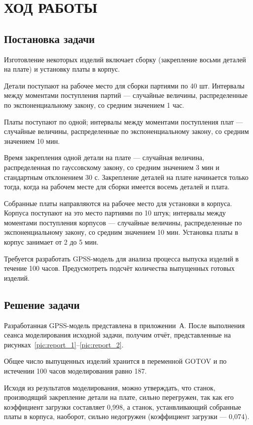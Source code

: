 \section{ХОД РАБОТЫ}

\subsection{Постановка задачи}

Изготовление некоторых изделий включает сборку (закрепление восьми деталей на плате)
и установку платы в корпус.

Детали поступают на рабочее место для сборки партиями по 40 шт.
Интервалы между моментами поступления партий --- случайные величины,
распределенные по экспоненциальному закону, со средним значением 1 час.

Платы поступают по одной; интервалы между моментами поступления плат --- случайные величины,
распределенные по экспоненциальному закону, со средним значением 10 мин.

Время закрепления одной детали на плате --- случайная величина, 
распределенная по гауссовскому закону, со средним значением 3 мин и стандартным отклонением 30 с.
Закрепление деталей на плате начинается только тогда, когда на рабочем месте для сборки
имеется восемь деталей и плата.

Собранные платы направляются на рабочее место для установки в корпуса.
Корпуса поступают на это место партиями по 10 штук; интервалы между моментами поступления корпусов
--- случайные величины, распределенные по экспоненциальному закону, со средним значением 10 мин.
Установка платы в корпус занимает от 2 до 5 мин.

Требуется разработать GPSS-модель для анализа процесса выпуска изделий в течение 100 часов.
Предусмотреть подсчёт количества выпущенных готовых изделий.

\subsection{Решение задачи}

Разработанная GPSS-модель представлена в приложении~А. После выполнения сеанса
моделирования исходной задачи, получим отчёт, представленные на
рисунках~\ref{pic:report_1}--\ref{pic:report_2}.

Общее число выпущенных изделий хранится в переменной GOTOV и 
по истечении 100 часов моделирования равно 187.

Исходя из результатов моделирования, можно утверждать, что 
станок, производящий закрепление детали на плате, сильно перегружен,
так как его коэффициент загрузки составляет 0{,}998, а станок,
устанвливающий собранные платы в корпуса, наоборот, сильно недогружен
(коэффициент загрузки --- 0{,}074). 


